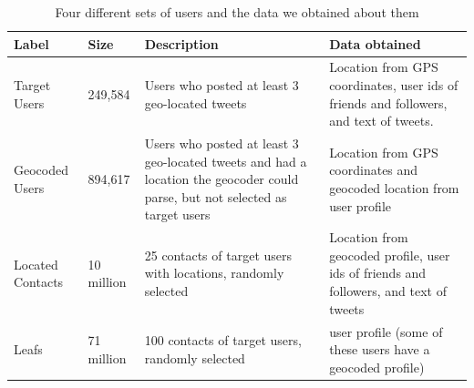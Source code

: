 %
%



\begin{table}[tb]
\scriptsize
\centering
\begin{tabular}{l l p{4cm} p{6cm}}
    Label & Size & Description & Data obtained \\
    \hline
    Target Users & 249,584 & Users who posted at least 3 geo-located tweets &
    Location from GPS coordinates, user ids of friends and followers,
    and text of tweets. \\
    Geocoded Users & 894,617 & Users who posted at least 3 geo-located tweets
    and had a location the geocoder could parse, but not selected as target users &
    Location from GPS coordinates and geocoded location from user profile \\
    Located Contacts & 10 million & 25 contacts of target users with locations, randomly selected &
    Location from geocoded profile, user ids of friends and followers, and text of tweets \\
    Leafs & 71 million & 100 contacts of target users, randomly selected &
    user profile (some of these users have a geocoded profile)\\
\end{tabular}
\caption{Four different sets of users and the data we obtained about them}
\label{tab:datasets}
\end{table}



